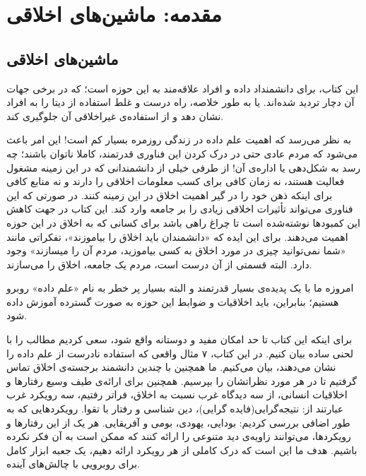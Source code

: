 \documentclass[12pt,oneside]{book}
\begin{document}
    \mainmatter


    \chapter{مقدمه: ماشین‌های اخلاقی}


    \section{ماشین‌های اخلاقی}

    این کتاب، برای دانشمنداد داده و افراد علاقه‌مند به این حوزه است؛ که در برخی جهات آن دچار تردید شده‌اند.
    یا به طور خلاصه، راه درست و غلط استفاده از دیتا را به افراد نشان دهد و از استفاده‌ی غیراخلاقی آن جلوگیری کند.

    به نظر می‌رسد که اهمیت علم داده در زندگی روزمره بسیار کم است!
    این امر باعث می‌شود که مردم عادی حتی در درک کردن این فناوری قدرتمند، کاملا ناتوان باشند؛ چه رسد به شکل‌دهی یا اداره‌ی آن!
    از طرفی خیلی از دانشمندانی که در این زمینه مشغول فعالیت هستند، نه زمان کافی برای کسب معلومات اخلاقی را دارند و نه منابع کافی برای اینکه ذهن خود را در گیر اهمیت اخلاق در این زمینه کنند.
    در صورتی که این فناوری می‌تواند تأثیرات اخلاقی زیادی را بر جامعه وارد کند.
    این کتاب در جهت کاهش این کمبودها نوشته‌شده است تا چراغ راهی باشد برای کسانی که به اخلاق در این حوزه اهمیت می‌دهند.
    برای این ایده که «دانشمندان باید اخلاق را بیاموزند»، تفکراتی مانند «شما نمی‌توانید چیزی در مورد اخلاق به کسی بیاموزید، مردم آن را میسازند» وجود دارد.
    البته قسمتی از آن درست است، مردم یک جامعه، اخلاق را می‌سازند.

    امروزه ما با یک پدیده‌ی بسیار قدرتمند و البته بسیار پر خطر به نام «علم داده» روبرو هستیم؛ بنابراین، باید اخلاقیات و ضوابط این حوزه به صورت گسترده آموزش داده شود.

    برای اینکه این کتاب تا حد امکان مفید و دوستانه واقع شود، سعی کردیم مطالب را با لحنی ساده بیان کنیم.
    در این کتاب، ۷ مثال واقعی که استفاده نادرست از علم داده را نشان می‌دهند، بیان می‌کنیم.
    ما همچنین با چندین دانشمند برجسته‌ی اخلاق تماس گرفتیم تا در هر مورد نظراتشان را بپرسیم.
    همچنین برای ارائه‌ی طیف وسیع رفتارها و اخلاقیات انسانی، از سه دیدگاه غرب نسبت به اخلاق، فراتر رفتیم، سه رویکرد غرب عبارتند از: نتیجه‌گرایی(فایده گرایی)، دین شناسی و رفتار با تقوا.
    رویکردهایی که به طور اضافی بررسی کردیم: بودایی، یهودی، بومی و آفریقایی.
    هر یک از این رفتارها و رویکردها، می‌توانند زاویه‌ی دید متنوعی را ارائه کنند که ممکن است به آن فکر نکرده باشیم.
    هدف ما این است که درک کاملی از هر رویکرد ارائه دهیم، یک جعبه ابزار کامل برای روبرویی با چالش‌های آینده.
\end{document}
